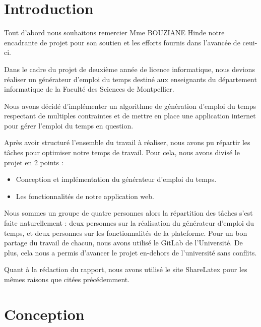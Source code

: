 \documentclass[12pt,a4paper,openany]{memoir}
\begin{document}
\clearpage
\tableofcontents
\clearpage


\chapter{Introduction}
\par
Tout d'abord nous souhaitons remercier Mme BOUZIANE Hinde notre encadrante de projet pour son soutien et les efforts fournis dans l'avancée de ceui-ci.
\par
Dans le cadre du projet de deuxième année de licence informatique, nous devions réaliser un générateur d'emploi du temps destiné aux enseignants du département informatique de la Faculté des Sciences de Montpellier.
\par
Nous avons décidé d'implémenter un algorithme de génération d'emploi du temps respectant de multiples contraintes et de mettre en place une application internet pour gérer l'emploi du temps en question.
\par
Après avoir structuré l'ensemble du travail à réaliser, nous avons pu répartir les tâches pour optimiser notre temps de travail. Pour cela, nous avons divisé le projet en 2 points : 
\begin{itemize}
    \item Conception et implémentation du générateur d'emploi du temps.
    \item Les fonctionnalités de notre application web.
\end{itemize}
\par
Nous sommes un groupe de quatre personnes alors la répartition des tâches s'est faite naturellement : deux personnes sur la réalisation du générateur d'emploi du temps, et deux personnes sur les fonctionnalités de la plateforme. Pour un bon partage du travail de chacun, nous avons utilisé le GitLab de l'Université. De plus, cela nous a permis d'avancer le projet en-dehors de l'université sans conflits.
\par
Quant à la rédaction du rapport, nous avons utilisé le site ShareLatex pour les mêmes raisons que citées précédemment.

\chapter{Conception}
\end{document}
